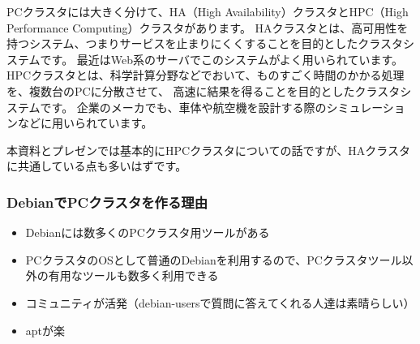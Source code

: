 \documentclass[mingoth,a4paper]{jsarticle}
\begin{document}
PCクラスタには大きく分けて、HA（High Availability）クラスタとHPC（High Performance Computing）クラスタがあります。
HAクラスタとは、高可用性を持つシステム、つまりサービスを止まりにくくすることを目的としたクラスタシステムです。
最近はWeb系のサーバでこのシステムがよく用いられています。
HPCクラスタとは、科学計算分野などでおいて、ものすごく時間のかかる処理を、複数台のPCに分散させて、
高速に結果を得ることを目的としたクラスタシステムです。
企業のメーカでも、車体や航空機を設計する際のシミュレーションなどに用いられています。

本資料とプレゼンでは基本的にHPCクラスタについての話ですが、HAクラスタに共通している点も多いはずです。

\subsubsection{DebianでPCクラスタを作る理由}
\begin{itemize}
\item Debianには数多くのPCクラスタ用ツールがある
\item PCクラスタのOSとして普通のDebianを利用するので、PCクラスタツール以外の有用なツールも数多く利用できる
\item コミュニティが活発（debian-usersで質問に答えてくれる人達は素晴らしい）
\item aptが楽
\end{itemize}
\end{document}
